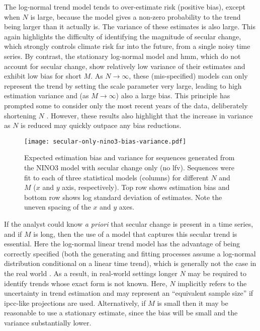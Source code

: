\documentclass[
]{agujournal2018}
\makeatletter
\newcommand{\ie}{i.e.\@\xspace}
\makeatother
\begin{document}
The log-normal trend model tends to over-estimate risk (positive bias), except when $N$ is large, because the model gives a non-zero probability to the trend being larger than it actually is.
The variance of these estimates is also large.
This again highlights the difficulty of identifying the magnitude of secular change, which strongly controls climate risk far into the future, from a single noisy time series.
By contrast, the stationary log-normal model and \gls{hmm}, which do not account for secular change, show relatively low variance of their estimates and exhibit low bias for short $M$.
As $N \rightarrow \infty$, these (mis-specified) models can only represent the trend by setting the scale parameter very large, leading to high estimation variance and (as $M \rightarrow \infty$) also a large bias.
This principle has prompted some to consider only the most recent years of the data, deliberately shortening $N$ \citep[\ie,][]{Muller:2014fc}.
However, these results also highlight that the increase in variance as $N$ is reduced may quickly outpace any bias reductions.

\begin{figure}
  \centering
  \texttt{[image: secular-only-nino3-bias-variance.pdf]}
  \caption{
    Expected estimation bias and variance for sequences generated from the NINO3 model with secular change only (no \gls{lfv}).
    Sequences were fit to each of three statistical models (columns) for different $N$ and $M$ ($x$ and $y$ axis, respectively).
    Top row shows estimation bias and bottom row shows log standard deviation of estimates.
    Note the uneven spacing of the $x$ and $y$ axes.
  }\label{fig:secular-nino3-bias-variance}
\end{figure}

If the analyst could know \emph{a priori} that secular change is present in a time series, and if $M$ is long, then the use of a model that captures this secular trend is essential.
Here the log-normal linear trend model has the advantage of being correctly specified (both the generating and fitting processes assume a log-normal distribution conditional on a linear time trend), which is generally not the case in the real world \citep{Montanari:2014hl,Serinaldi:2015bq}.
As a result, in real-world settings longer $N$ may be required to identify trends whose exact form is not known.
Here, $N$ implicitly refers to the uncertainty in trend estimation and may represent an ``equivalent sample size'' if \gls{ipcc}-like projections are used.
Alternatively, if $M$ is small then it may be reasonable to use a stationary estimate, since the bias will be small and the variance substantially lower.
\end{document}
